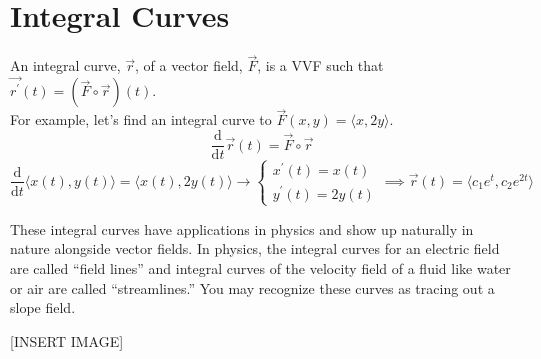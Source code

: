 \section{Integral Curves}
\noindent
An integral curve, $\vec{r}$, of a vector field, $\vec{F}$, is a VVF such that $\vec{r^\prime}(t) = \left(\vec{F}\circ\vec{r}\right)(t)$.\\

\noindent
For example, let's find an integral curve to $\vec{F}(x,y) = \langle x, 2y\rangle$.
\begin{equation*}
	\frac{\mathrm{d}}{\mathrm{d}t}\vec{r}(t) = \vec{F}\circ\vec{r}	
\end{equation*}
\begin{equation*}
	\frac{\mathrm{d}}{\mathrm{d}t}\langle x(t), y(t) \rangle = \langle x(t), 2 y(t) \rangle \to
	\begin{cases}
		x^\prime(t) = x(t) \\
		y^\prime(t) = 2 y(t)
	\end{cases} 
	\implies \vec{r}(t) = \langle c_1 e^t, c_2 e^{2t} \rangle
\end{equation*}

\noindent
These integral curves have applications in physics and show up naturally in nature alongside vector fields. In physics, the integral curves for an electric field are called “field lines” and integral curves of the velocity field of a fluid like water or air are called “streamlines.” You may recognize these curves as tracing out a slope field.

[INSERT IMAGE]